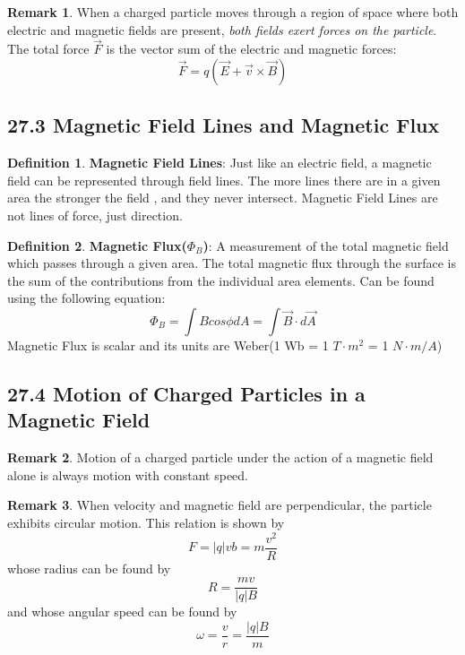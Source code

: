 \documentclass[12pt]{amsart}
\theoremstyle{definition}
\newtheorem{definition}{Definition} %
\newtheorem*{remark}{Remark}        %
\numberwithin{equation}{theorem}    %
\begin{document}
\begin{remark}
    When a charged particle moves through a region of space where both electric and magnetic fields are present, \textit{both fields exert forces on the particle}. The total force $\vec{F}$ is the vector sum of the electric and magnetic forces: $$\vec{F}=q(\vec{E} + \vec{v}\times \vec{B})$$
\end{remark}

\subsection*{27.3 Magnetic Field Lines and Magnetic Flux}

\begin{definition}
    \textbf{Magnetic Field Lines}:
    Just like an electric field, a magnetic field can be represented through field lines. The more lines there are in a given area the stronger the field , and they never intersect. Magnetic Field Lines are not lines of force, just direction.
\end{definition}

\begin{definition}
    \textbf{Magnetic Flux($\Phi_B$)}:
    A measurement of the total magnetic field which passes through a given area. The total magnetic flux through the surface is the sum of the contributions from the individual area elements. Can be found using the following equation:
    $$\Phi_B = \int B cos\phi dA = \int\vec{B}\cdot d \vec{A}$$
    Magnetic Flux is scalar and its units are Weber(1 Wb = 1 $T\cdot m^2$ = 1 $N\cdot m/A$)

\end{definition}

\subsection*{27.4 Motion of Charged Particles in a Magnetic Field}

\begin{remark}
    Motion of a charged particle under the action of a magnetic field alone is always motion with constant speed.
\end{remark}

\begin{remark}
    When velocity and magnetic field are perpendicular, the particle exhibits circular motion. This relation is shown by $$F = |q|vb = m\frac{v^2}{R}$$ whose radius can be found by $$R = \frac{mv}{|q|B}$$ and whose angular speed can be found by $$\omega = \frac{v}{r} = \frac{|q|B}{m}$$
\end{remark}
\end{document}
